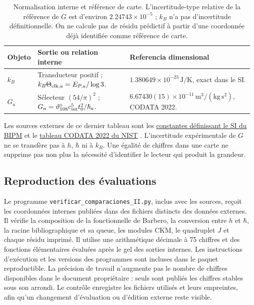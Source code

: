 \begin{table}[htbp]
\centering\small
\begin{tabularx}{\linewidth}{@{}lXX@{}}
\toprule
Objeto & Sortie ou relation interne & Referencia dimensional\\
\midrule
\(k_B\) & Transducteur positif ; \(k_B\Theta_{{\rm clk},a}=E_{P,a}/\log3\).
& \(1.380649\times10^{-23}\,\mathrm{J/K}\), exact dans le SI.\\[4pt]
\(G_a\) & Sélecteur \((54/\pi)^2\) ; \(G_a=\vartheta_{108}^{\circ}c_{\rm int}^5t_0^2/\hbar_a\).
& \(6.67430(15)\times10^{-11}\,\mathrm{m^3/(kg\,s^2)}\), CODATA 2022.\\
\bottomrule
\end{tabularx}
\caption{Normalisation interne et référence de carte. L’incertitude-type
relative de la référence de \(G\) est d’environ
\(2.24743\times10^{-5}\) ; \(k_B\) n’a pas d’incertitude définitionnelle.
On ne calcule pas de résidu prédictif à partir d’une coordonnée déjà
identifiée comme référence de carte.}
\label{ii:tab:ii-kb-g-cartas}
\end{table}

Les sources externes de ce dernier tableau sont les
\href{https://www.bipm.org/en/measurement-units/si-defining-constants}
{constantes définissant le SI du BIPM} et le
\href{https://physics.nist.gov/cuu/Constants/Table/allascii.txt}
{tableau CODATA 2022 du NIST} \cite{ii:codata2022}.
L’incertitude expérimentale de \(G\) ne se transfère pas à \(h\),
\(\hbar\) ni à \(k_B\). Une égalité de chiffres dans une carte
ne supprime pas non plus la nécessité d’identifier le lecteur qui produit la grandeur.

\subsection{Reproduction des évaluations}

Le programme \texttt{verificar\_comparaciones\_II.py}, inclus avec les
sources, reçoit les coordonnées internes publiées dans des fichiers distincts
des données externes. Il vérifie la composition de la fonctionnelle de Barbero,
la conversion entre \(h\) et \(\hbar\), la racine bibliographique et sa queue,
les modules CKM, le quadruplet \(J\) et chaque résidu imprimé. Il utilise
une arithmétique décimale à 75 chiffres et des fonctions élémentaires évaluées après
le gel des sorties internes. Les instructions d’exécution
et les versions des programmes sont incluses dans le paquet reproductible.
La précision de travail n’augmente pas le nombre de chiffres disponibles dans le
document propriétaire : seuls sont publiés les chiffres stables sous son arrondi.
Le contrôle enregistre les fichiers utilisés et leurs empreintes, afin
qu’un changement d’évaluation ou d’édition externe reste visible.

